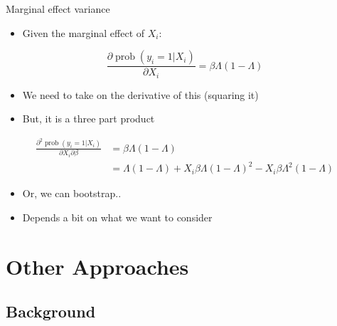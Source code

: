 \documentclass[
  ignorenonframetext,
]{beamer}
\providecommand{\tightlist}{%
  \setlength{\itemsep}{0pt}\setlength{\parskip}{0pt}}
\DeclareMathOperator{\prob}{prob}
\begin{document}
\begin{frame}{Marginal effect variance}
\protect{}\label{marginal-effect-variance}
\begin{itemize}
\tightlist
\item
  Given the marginal effect of \(X_i\):
\end{itemize}

\[
\frac{\partial \prob(y_i=1|X_i)}{\partial X_i} = \beta \Lambda (1-\Lambda) 
\]

\begin{itemize}
\tightlist
\item
  We need to take on the derivative of this (squaring it)
\item
  But, it is a three part product
\end{itemize}

\[
\begin{split}
\frac{\partial^2 \prob(y_i=1|X_i)}{\partial X_i \partial \beta} &= \beta \Lambda (1-\Lambda) \\
 &= \Lambda (1-\Lambda) + X_i \beta \Lambda (1-\Lambda)^2 - X_i\beta\Lambda^2(1-\Lambda)
 \end{split}
\]

\begin{itemize}
\tightlist
\item
  Or, we can bootstrap..
\item
  Depends a bit on what we want to consider
\end{itemize}
\end{frame}

\section{Other Approaches}\label{other-approaches}

\subsection{Background}\label{background}
\end{document}
